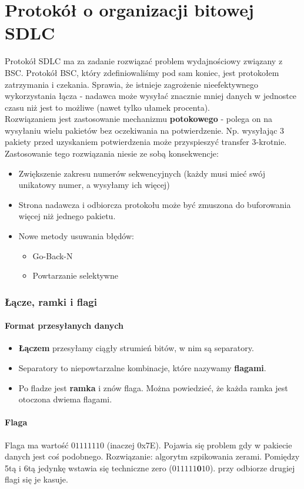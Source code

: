 \documentclass[a4paper,twoside]{article}
\begin{document}
\part{Protokół o organizacji bitowej SDLC}
Protokół SDLC ma za zadanie rozwiązać problem wydajnościowy związany z BSC. Protokół BSC, który zdefiniowaliśmy pod sam koniec, jest protokołem zatrzymania i czekania. Sprawia, że istnieje zagrożenie nieefektywnego wykorzystania łącza - nadawca może wysyłać znacznie mniej danych w jednostce czasu niż jest to możliwe (nawet tylko ułamek procenta).\\
Rozwiązaniem jest zastosowanie mechanizmu \textbf{potokowego} - polega on na wysyłaniu wielu pakietów bez oczekiwania na potwierdzenie. Np. wysyłając 3 pakiety przed uzyskaniem potwierdzenia może przyspieszyć transfer 3-krotnie.\\
Zastosowanie tego rozwiązania niesie ze sobą konsekwencje:
\begin{itemize}
	\item Zwiększenie zakresu numerów sekwencyjnych (każdy musi mieć swój unikatowy numer, a wysyłamy ich więcej)
	\item Strona nadawcza i odbiorcza protokołu może być zmuszona do buforowania więcej niż jednego pakietu.
	\item Nowe metody usuwania błędów:
	\begin{itemize}
		\item Go-Back-N
		\item Powtarzanie selektywne
	\end{itemize}
\end{itemize}
\section{Łącze, ramki i flagi}
\subsection{Format przesyłanych danych}
\begin{itemize}
	\item \textbf{Łączem} przesyłamy ciągły strumień bitów, w nim są separatory.
	\item Separatory to niepowtarzalne kombinacje, które nazywamy \textbf{flagami}.
	\item Po fladze jest \textbf{ramka} i znów flaga. Można powiedzieć, że każda ramka jest otoczona dwiema flagami.
\end{itemize}
\subsection{Flaga}
Flaga ma wartość $ 01111110 $ (inaczej 0x7E). Pojawia się problem gdy w pakiecie danych jest coś podobnego. Rozwiązanie: algorytm szpikowania zerami. Pomiędzy 5tą i 6tą jedynkę wstawia się techniczne zero ($ 011111\textbf{0}10 $). przy odbiorze drugiej flagi się je kasuje.
\end{document}
